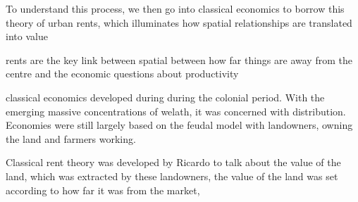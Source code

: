 \documentclass[]{article}
\begin{document}
To understand this process, we then  go into classical economics to borrow this theory of urban rents, which illuminates how  spatial relationships are translated into value 

rents are the key link between spatial between how far things are away from the centre and the economic questions about productivity %




classical economics developed during during the colonial period. With the emerging massive concentrations of welath, it was %
concerned with distribution. Economies were still largely based on the feudal model with landowners, owning the land and farmers working.

Classical rent theory was developed by Ricardo to talk about the value of the land, which was extracted by these landowners,%
the value of the land was set according to how far it was from the market, %
\end{document}
